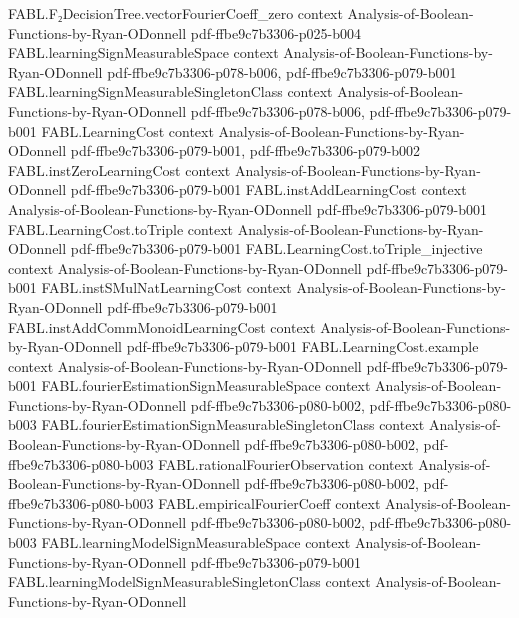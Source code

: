 \begin{theorem}
\proofstep
  {FABL.F₂DecisionTree.vectorFourierCoeff_zero}
  {context}
  {Analysis-of-Boolean-Functions-by-Ryan-ODonnell}
  {pdf-ffbe9c7b3306-p025-b004}
\proofstep
  {FABL.learningSignMeasurableSpace}
  {context}
  {Analysis-of-Boolean-Functions-by-Ryan-ODonnell}
  {pdf-ffbe9c7b3306-p078-b006,
    pdf-ffbe9c7b3306-p079-b001}
\proofstep
  {FABL.learningSignMeasurableSingletonClass}
  {context}
  {Analysis-of-Boolean-Functions-by-Ryan-ODonnell}
  {pdf-ffbe9c7b3306-p078-b006,
    pdf-ffbe9c7b3306-p079-b001}
\proofstep
  {FABL.LearningCost}
  {context}
  {Analysis-of-Boolean-Functions-by-Ryan-ODonnell}
  {pdf-ffbe9c7b3306-p079-b001,
    pdf-ffbe9c7b3306-p079-b002}
\proofstep
  {FABL.instZeroLearningCost}
  {context}
  {Analysis-of-Boolean-Functions-by-Ryan-ODonnell}
  {pdf-ffbe9c7b3306-p079-b001}
\proofstep
  {FABL.instAddLearningCost}
  {context}
  {Analysis-of-Boolean-Functions-by-Ryan-ODonnell}
  {pdf-ffbe9c7b3306-p079-b001}
\proofstep
  {FABL.LearningCost.toTriple}
  {context}
  {Analysis-of-Boolean-Functions-by-Ryan-ODonnell}
  {pdf-ffbe9c7b3306-p079-b001}
\proofstep
  {FABL.LearningCost.toTriple_injective}
  {context}
  {Analysis-of-Boolean-Functions-by-Ryan-ODonnell}
  {pdf-ffbe9c7b3306-p079-b001}
\proofstep
  {FABL.instSMulNatLearningCost}
  {context}
  {Analysis-of-Boolean-Functions-by-Ryan-ODonnell}
  {pdf-ffbe9c7b3306-p079-b001}
\proofstep
  {FABL.instAddCommMonoidLearningCost}
  {context}
  {Analysis-of-Boolean-Functions-by-Ryan-ODonnell}
  {pdf-ffbe9c7b3306-p079-b001}
\proofstep
  {FABL.LearningCost.example}
  {context}
  {Analysis-of-Boolean-Functions-by-Ryan-ODonnell}
  {pdf-ffbe9c7b3306-p079-b001}
\proofstep
  {FABL.fourierEstimationSignMeasurableSpace}
  {context}
  {Analysis-of-Boolean-Functions-by-Ryan-ODonnell}
  {pdf-ffbe9c7b3306-p080-b002,
    pdf-ffbe9c7b3306-p080-b003}
\proofstep
  {FABL.fourierEstimationSignMeasurableSingletonClass}
  {context}
  {Analysis-of-Boolean-Functions-by-Ryan-ODonnell}
  {pdf-ffbe9c7b3306-p080-b002,
    pdf-ffbe9c7b3306-p080-b003}
\proofstep
  {FABL.rationalFourierObservation}
  {context}
  {Analysis-of-Boolean-Functions-by-Ryan-ODonnell}
  {pdf-ffbe9c7b3306-p080-b002,
    pdf-ffbe9c7b3306-p080-b003}
\proofstep
  {FABL.empiricalFourierCoeff}
  {context}
  {Analysis-of-Boolean-Functions-by-Ryan-ODonnell}
  {pdf-ffbe9c7b3306-p080-b002,
    pdf-ffbe9c7b3306-p080-b003}
\proofstep
  {FABL.learningModelSignMeasurableSpace}
  {context}
  {Analysis-of-Boolean-Functions-by-Ryan-ODonnell}
  {pdf-ffbe9c7b3306-p079-b001}
\proofstep
  {FABL.learningModelSignMeasurableSingletonClass}
  {context}
  {Analysis-of-Boolean-Functions-by-Ryan-ODonnell}

\end{theorem}
